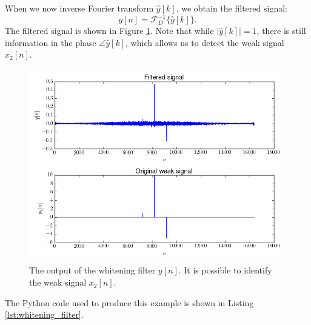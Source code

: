 When we now inverse Fourier transform $\hat{y}[k]$, we obtain the filtered signal:
\begin{equation}
y[n] = \mathcal{F}_D^{-1}\{\hat{y}[k]\}.
\end{equation}
The filtered signal is shown in Figure \ref{fig:whitened_output}.
Note that while $|\hat{y}[k]|=1$, there is still information in the
phase $\angle \hat{y}[k]$, which allows us to detect the weak signal
$x_2[n]$.
\begin{figure}
\begin{center}
\includegraphics[width=\textwidth]{ch17/figures/whiten_filtered.png}
\end{center}
\caption{The output of the whitening filter $y[n]$. It is possible to identify the weak signal $x_2[n]$.}
\label{fig:whitened_output}
\end{figure}

The Python code used to produce this example is shown in Listing \ref{lst:whitening_filter}.



